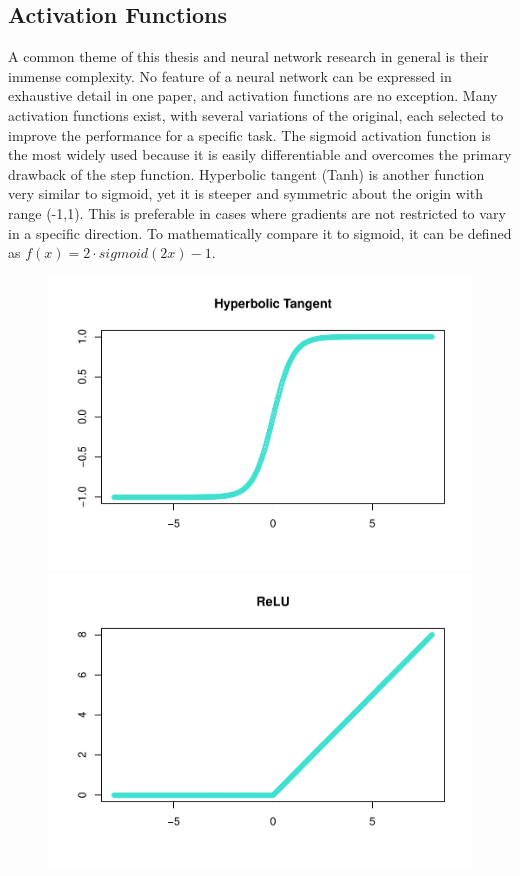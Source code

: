 
\hypertarget{activation-functions}{%
\subsection{Activation Functions}\label{activation-functions}}

A common theme of this thesis and neural network research in general is their immense complexity.  No feature of a neural network can be expressed in exhaustive detail in one paper, and activation functions are no exception.  Many activation functions exist, with several variations of the original, each selected to improve the performance for a specific task.  The sigmoid activation function is the most widely used because it is easily differentiable and overcomes the primary drawback of the step function.  Hyperbolic tangent (Tanh) is another function very similar to sigmoid, yet it is steeper and symmetric about the origin with range (-1,1).  This is preferable in cases where gradients are not restricted to vary in a specific direction.  To mathematically compare it to sigmoid, it can be defined as $f(x) = 2 \cdot sigmoid(2x) - 1$.



\begin{figure}[H]
    \includegraphics[width=0.5\linewidth]{Figures/other-activation-functions-1.pdf}
    \includegraphics[width=0.5\linewidth]{Figures/other-activation-functions-2.pdf}
    \vspace{-40pt}
\end{figure}

